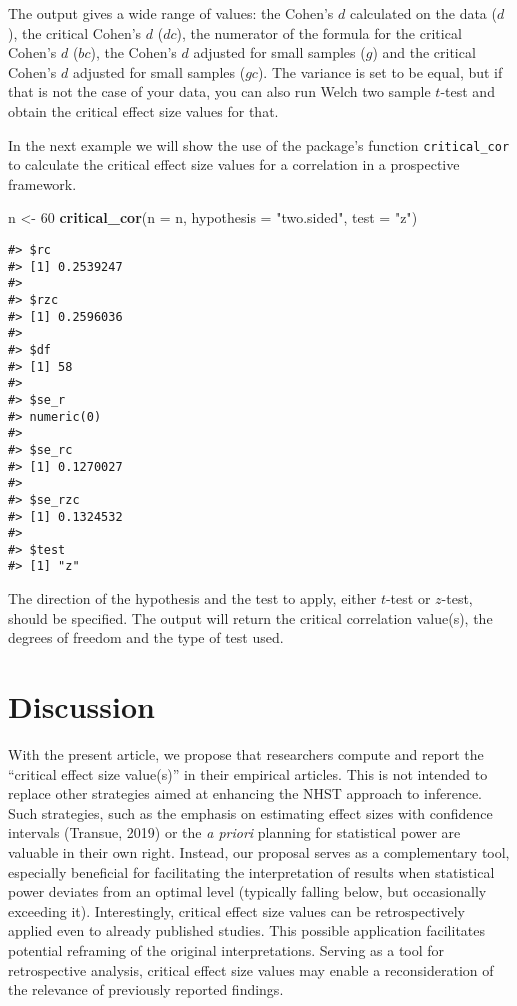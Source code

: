 \documentclass[
  man]{apa7}
\newenvironment{Shaded}{\begin{snugshade}}{\end{snugshade}}
\newcommand{\AttributeTok}[1]{\textcolor[rgb]{0.13,0.29,0.53}{#1}}
\newcommand{\DecValTok}[1]{\textcolor[rgb]{0.00,0.00,0.81}{#1}}
\newcommand{\FunctionTok}[1]{\textcolor[rgb]{0.13,0.29,0.53}{\textbf{#1}}}
\newcommand{\NormalTok}[1]{#1}
\newcommand{\OtherTok}[1]{\textcolor[rgb]{0.56,0.35,0.01}{#1}}
\newcommand{\StringTok}[1]{\textcolor[rgb]{0.31,0.60,0.02}{#1}}
\begin{document}
The output gives a wide range of values: the Cohen's \(d\) calculated on the data (\(d\)), the critical Cohen's \(d\) (\(dc\)), the numerator of the formula for the critical Cohen's \(d\) (\(bc\)), the Cohen's \(d\) adjusted for small samples (\(g\)) and the critical Cohen's \(d\) adjusted for small samples (\(gc\)). The variance is set to be equal, but if that is not the case of your data, you can also run Welch two sample \(t\)-test and obtain the critical effect size values for that.

In the next example we will show the use of the package's function \texttt{critical\_cor} to calculate the critical effect size values for a correlation in a prospective framework.

\begin{Shaded}
\begin{Highlighting}[]
\NormalTok{n }\OtherTok{\textless{}{-}} \DecValTok{60}
\FunctionTok{critical\_cor}\NormalTok{(}\AttributeTok{n =}\NormalTok{ n, }\AttributeTok{hypothesis =} \StringTok{"two.sided"}\NormalTok{, }\AttributeTok{test =} \StringTok{"z"}\NormalTok{)}
\end{Highlighting}
\end{Shaded}

\begin{verbatim}
#> $rc
#> [1] 0.2539247
#> 
#> $rzc
#> [1] 0.2596036
#> 
#> $df
#> [1] 58
#> 
#> $se_r
#> numeric(0)
#> 
#> $se_rc
#> [1] 0.1270027
#> 
#> $se_rzc
#> [1] 0.1324532
#> 
#> $test
#> [1] "z"
\end{verbatim}

The direction of the hypothesis and the test to apply, either \(t\)-test or \(z\)-test, should be specified. The output will return the critical correlation value(s), the degrees of freedom and the type of test used.

\section{Discussion}\label{discussion}

With the present article, we propose that researchers compute and report the ``critical effect size value(s)'' in their empirical articles. This is not intended to replace other strategies aimed at enhancing the NHST approach to inference. Such strategies, such as the emphasis on estimating effect sizes with confidence intervals (Transue, 2019) or the \textit{a priori} planning for statistical power are valuable in their own right. Instead, our proposal serves as a complementary tool, especially beneficial for facilitating the interpretation of results when statistical power deviates from an optimal level (typically falling below, but occasionally exceeding it). Interestingly, critical effect size values can be retrospectively applied even to already published studies. This possible application facilitates potential reframing of the original interpretations. Serving as a tool for retrospective analysis, critical effect size values may enable a reconsideration of the relevance of previously reported findings.
\end{document}
